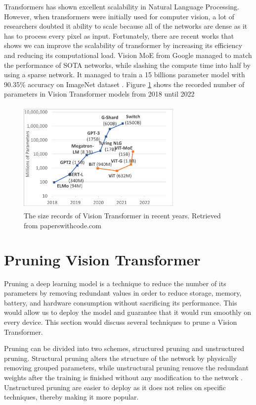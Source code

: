 \begin{enumerate}
    Transformers has shown excellent scalability in Natural Language Processing. However, when transformers were initially used for computer vision, a lot of researchers doubted it ability to scale because all of the networks are dense as it has to process every pixel as input. Fortunately, there are recent works that shows we can improve the scalability of transformer by increasing its efficiency and reducing its computational load. Vision MoE from Google managed to match the performance of SOTA networks, while slashing the compute time into half by using a sparse network. It managed to train a 15 billions parameter model with 90.35\% accuracy on ImageNet dataset \cite{scaling-sparse}. Figure \ref{fig:scaling} shows the recorded number of parameters in Vision Transformer models from 2018 until 2022

\begin{figure}[!h]
\includegraphics[width=8cm, height=5.5cm]{images/scaling.png}
\centering
\caption{The size records of Vision Transformer in recent years. Retrieved from paperswithcode.com}
\label{fig:scaling}
\end{figure}
\end{enumerate}

\section{Pruning Vision Transformer}

Pruning a deep learning model is a technique to reduce the number of its parameters by removing redundant values in order to reduce storage, memory, battery, and hardware consumption without sacrificing its performance. This would allow us to deploy the model and guarantee that it would run smoothly on every device. This section would discuss several techniques to prune a Vision Transformer.

Pruning can be divided into two schemes, structured pruning and unstructured pruning. Structural pruning alters the structure of the network by physically removing grouped parameters, while unstructural pruning remove the redundant weights after the training is finished without any modification to the network \cite{depgraph}. Unstructured pruning are easier to deploy as it does not relies on specific techniques, thereby making it more popular.

